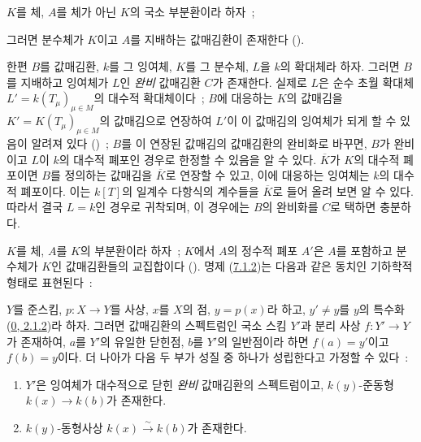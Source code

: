 \begin{env}[7.1.2]
\label{II.7.1.2-ko}
$K$를 체, $A$를 체가 아닌 $K$의 국소 부분환이라 하자~;


그러면 분수체가 $K$이고 $A$를 지배하는 값매김환이 존재한다
(\cite[p.~1-07, lemme~2]{I-1}).

한편 $B$를 값매김환, $k$를 그 잉여체, $K$를 그 분수체, $L$을 $k$의
확대체라 하자. 그러면 $B$를 지배하고 잉여체가 $L$인 \emph{완비}
값매김환 $C$가 존재한다. 실제로 $L$은 순수 초월 확대체
$L'=k(T_\mu)_{\mu\in M}$의 대수적 확대체이다~; $B$에 대응하는 $K$의
값매김을 $K'=K(T_\mu)_{\mu\in M}$의 값매김으로 연장하여 $L'$이 이
값매김의 잉여체가 되게 할 수 있음이 알려져 있다
(\cite[p.~98]{II-24})~; $B$를 이 연장된 값매김의 값매김환의 완비화로
바꾸면, $B$가 완비이고 $L$이 $k$의 대수적 폐포인 경우로 한정할 수
있음을 알 수 있다. $\overline{K}$가 $K$의 대수적 폐포이면 $B$를
정의하는 값매김을 $\overline{K}$로 연장할 수 있고, 이에 대응하는
잉여체는 $k$의 대수적 폐포이다. 이는 $k[T]$의 일계수 다항식의
계수들을 $\overline{K}$로 들어 올려 보면 알 수 있다. 따라서 결국
$L=k$인 경우로 귀착되며, 이 경우에는 $B$의 완비화를 $C$로 택하면
충분하다.
\end{env}

\begin{env}[7.1.3]
\label{II.7.1.3-ko}
$K$를 체, $A$를 $K$의 부분환이라 하자~; $K$에서 $A$의 정수적 폐포
$A'$은 $A$를 포함하고 분수체가 $K$인 값매김환들의 교집합이다
(\cite[p.~51, th.~2]{I-11}). 명제
(\hyperref[II.7.1.2-ko]{7.1.2})는 다음과 같은 동치인 기하학적 형태로
표현된다~:
\end{env}

\begin{proposition}[7.1.4]
\label{II.7.1.4-ko}
$Y$를 준스킴, $p:X\to Y$를 사상, $x$를 $X$의 점, $y=p(x)$라 하고,
$y'\neq y$를 $y$의 특수화
(\hyperref[0.2.1.2-ko]{0, 2.1.2})라 하자. 그러면 값매김환의 스펙트럼인
국소 스킴 $Y'$과 분리 사상 $f:Y'\to Y$가 존재하여, $a$를 $Y'$의
유일한 닫힌점, $b$를 $Y'$의 일반점이라 하면 $f(a)=y'$이고
$f(b)=y$이다. 더 나아가 다음 두 부가 성질 중 하나가 성립한다고
가정할 수 있다~:
\begin{enumerate}
\item[\rm{(i)}] $Y'$은 잉여체가 대수적으로 닫힌 \emph{완비}
값매김환의 스펙트럼이고, $k(y)$-준동형 $k(x)\to k(b)$가 존재한다.
\item[\rm{(ii)}] $k(y)$-동형사상
$k(x)\xrightarrow{\sim}k(b)$가 존재한다.
\end{enumerate}
\end{proposition}


